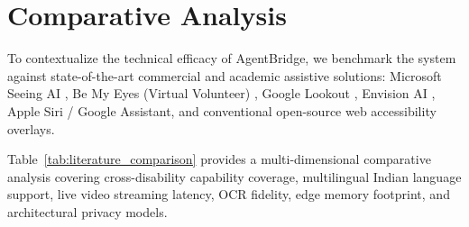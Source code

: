 \documentclass[10pt,a4paper]{article}
\begin{document}
\FloatBarrier
\section{Comparative Analysis}

To contextualize the technical efficacy of AgentBridge, we benchmark the system against state-of-the-art commercial and academic assistive solutions: Microsoft Seeing AI \citep{microsoftSeeingAI}, Be My Eyes (Virtual Volunteer) \citep{bemyeyes2021}, Google Lookout \citep{lookout2020}, Envision AI \citep{envision2022}, Apple Siri / Google Assistant, and conventional open-source web accessibility overlays.

Table~\ref{tab:literature_comparison} provides a multi-dimensional comparative analysis covering cross-disability capability coverage, multilingual Indian language support, live video streaming latency, OCR fidelity, edge memory footprint, and architectural privacy models.
\end{document}
